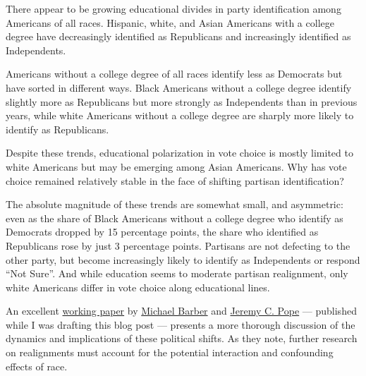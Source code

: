 \documentclass[
]{article}
\begin{document}
There appear to be growing educational divides in party identification
among Americans of all races. Hispanic, white, and Asian Americans with
a college degree have decreasingly identified as Republicans and
increasingly identified as Independents.

Americans without a college degree of all races identify less as
Democrats but have sorted in different ways. Black Americans without a
college degree identify slightly more as Republicans but more strongly
as Independents than in previous years, while white Americans without a
college degree are sharply more likely to identify as Republicans.

Despite these trends, educational polarization in vote choice is mostly
limited to white Americans but may be emerging among Asian Americans.
Why has vote choice remained relatively stable in the face of shifting
partisan identification?

The absolute magnitude of these trends are somewhat small, and
asymmetric: even as the share of Black Americans without a college
degree who identify as Democrats dropped by 15 percentage points, the
share who identified as Republicans rose by just 3 percentage points.
Partisans are not defecting to the other party, but become increasingly
likely to identify as Independents or respond ``Not Sure''. And while
education seems to moderate partisan realignment, only white Americans
differ in vote choice along educational lines.

An excellent
\href{https://www.dropbox.com/s/3nsueuaoquxzki1/realignments_draft.pdf?dl=0}{working
paper} by \href{http://michaeljaybarber.com/}{Michael Barber} and
\href{http://jeremypope.byu.edu/}{Jeremy C. Pope} --- published while I
was drafting this blog post --- presents a more thorough discussion of
the dynamics and implications of these political shifts. As they note,
further research on realignments must account for the potential
interaction and confounding effects of race.
\end{document}
